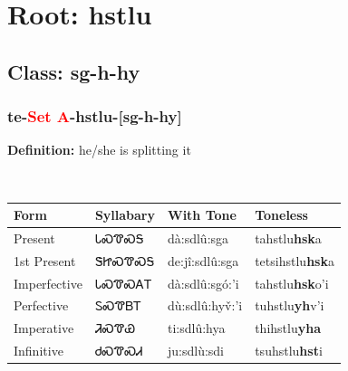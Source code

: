 \needspace{4in}
\section*{Root: hstlu}
\nopagebreak
{}
\needspace{3in}
\subsection*{Class: sg-h-hy}
\nopagebreak
\needspace{2in}
\subsubsection*{te{-}\textcolor{Red}{Set A}{-}\textbf{hstlu}{-}[sg-h-hy]}
\nopagebreak
\textbf{Definition: } he/she is splitting it
\\[0.5em]
\begin{tabularx}{\textwidth}{l X X X}%
\toprule%
\textbf{Form}&\textbf{Syllabary}&\textbf{With Tone}&\textbf{Toneless}\\%
\midrule%
Present&ᏓᏍᏡᏍᎦ&dà:sdlû:sga&tahstlu\textbf{hsk}a\\%
1st Present&ᏕᏥᏍᏡᏍᎦ&de:jî:sdlû:sga&tetsihstlu\textbf{hsk}a\\%
Imperfective&ᏓᏍᏡᏍᎪᎢ&dà:sdlû:sgó:’i&tahstlu\textbf{hsk}o'i\\%
Perfective&ᏚᏍᏡᏴᎢ&dù:sdlû:hyv̌:’i&tuhstlu\textbf{yh}v'i\\%
Imperative&ᏘᏍᏡᏯ&ti:sdlû:hya&thihstlu\textbf{yha}\\%
Infinitive&ᏧᏍᏡᏍᏗ&ju:sdlù:sdi&tsuhstlu\textbf{hst}i\\%
\bottomrule%
\end{tabularx}
\\[1em]